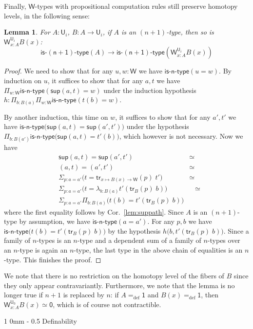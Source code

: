 \documentclass[reqno,10pt,a4paper,oneside]{amsart}
\makeatletter
\newcommand{\prd}[1]{\Pi_{#1}}
\newcommand{\sm}[1]{\Sigma_{#1}}
\newcommand{\lam}[1]{\lambda_{#1}}
\newcommand{\defeq}{=_{\mathrm{def}}}
\newcommand{\W}{\mathsf{W}}
\newcommand{\wsup}{\mathsf{sup}}
\newcommand{\one}{\mathsf{1}}
\newcommand{\zero}{\mathsf{0}}
\newcommand{\UU}{\mathsf{U}}
\newcommand{\isntype}[1]{\mathsf{is}\text{-}\mathsf{#1}\text{-}\mathsf{type}}
\newcommand{\trans}{\mathsf{tr}}
\renewcommand{\section}{\@startsection
  {section}%
   {1}%
  {0mm}%
   {-\baselineskip}%
  {0.5\baselineskip}%
   {\Large\bfseries}}%
\numberwithin{equation}{section}
\theoremstyle{mythm}
\newtheorem{lemma}[theorem]{Lemma}
\theoremstyle{mydef}
\theoremstyle{myrmk}
\makeatother
\begin{document}
Finally, $\W$-types with propositional computation rules still preserve homotopy levels, in the following sense:
\begin{lemma}
For $A:\UU_i$, $B : A \to \UU_i$, if $A$ is an $(n+1)$-type, then so is $\W^{\UU_i}_{x:A} B(x)$:
\[ \isntype{(n+1)}(A) \to \isntype{(n+1)}(\W^{\UU_i}_{x:A} B(x))\]
\end{lemma}
\begin{proof}
We need to show that for any $u,w : \W$ we have $\isntype{n}(u = w)$. By induction on $u$, it suffices to show that for any $a,t$ we have $\prd{w:\W} \isntype{n}(\wsup(a,t) = w)$ under the induction hypothesis $h : \prd{b:B(a)}\prd{w:\W} \isntype{n}(t(b) = w)$. 

By another induction, this time on $w$, it suffices to show that for any $a',t'$ we have
$\isntype{n}\big(\wsup(a,t) = \wsup(a',t')\big)$ under the hypothesis $\prd{b:B(a')} \isntype{n}\big(\wsup(a,t) = t'(b)\big)$, which however is not necessary. Now we have
\begin{alignat*}{4}
& \wsup(a,t) = \wsup(a',t') & \simeq \\
& (a,t) = (a',t') & \simeq \\
& \sm{p : a = a'} \big(t = \trans_{x \mapsto B(x) \to \W}(p) \; t'\big) & \simeq \\
& \sm{p : a = a'} \big(t = \lam{b:B(a)} t'(\trans_B(p) \; b)\big) & \;\;\; \simeq \\
& \sm{p : a = a'}\prd{b:B(a)} \big(t(b) = t'(\trans_B(p) \; b)\big) & \;\;\;
\end{alignat*}
where the first equality follows by Cor.~\ref{lem:suppath}. Since $A$ is an $(n+1)$-type by assumption, we have $\isntype{n}(a=a')$. For any $p,b$ we have $\isntype{n}\big(t(b) = t'(\trans_B(p) \; b)\big)$ by the hypothesis $h\big(b,t'(\trans_B(p) \; b)\big)$. Since a family of $n$-types is an $n$-type and a dependent sum of a family of $n$-types over an $n$-type is again an $n$-type, the last type in the above chain of equalities is an $n$-type. This finishes the proof.
\end{proof}

We note that there is no restriction on the homotopy level of the fibers of $B$ since they only appear contravariantly. Furthermore, we note that the lemma is no longer true if $n+1$ is replaced by $n$: if $A \defeq \one$ and $B(x) \defeq \one$, then $\W^{\UU_0}_{x:A} B(x) \simeq \zero$, which is of course not contractible. 


\section{Definability}
\label{sec:definability}
\end{document}
